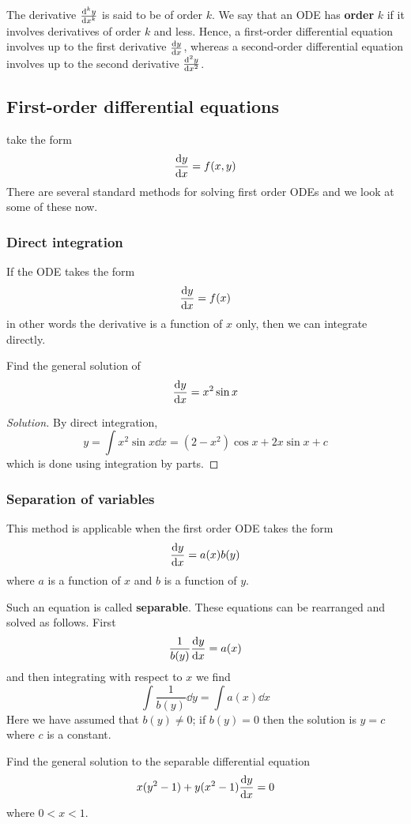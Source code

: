 The derivative $\dv[k]{y}{x}$ is said to be of order $k$. We say that an ODE has \textbf{order} $k$ if it involves derivatives of order $k$ and less. Hence, a first-order differential equation involves up to the first derivative $\dv{y}{x}$, whereas a second-order differential equation involves up to the second derivative $\dv[2]{y}{x}$.

\subsection{First-order differential equations}
 take the form
\[ \dv{y}{x} = f(x,y) \]
There are several standard methods for solving first order ODEs and we look at some of these now.

\subsubsection{Direct integration}
If the ODE takes the form
\[ \dv{y}{x} = f(x) \]
in other words the derivative is a function of $x$ only, then we can integrate directly.

\begin{exmp}{}{}
Find the general solution of
\[ \dv{y}{x} = x^2\sin x \]
\end{exmp}

\begin{proof}[Solution]
By direct integration,
\[ y = \int x^2\sin x \dd{x} = (2-x^2) \cos x + 2x \sin x + c \]
which is done using integration by parts.
\end{proof}

\subsubsection{Separation of variables}
This method is applicable when the first order ODE takes the form
\[ \dv{y}{x} = a(x)b(y) \]
where $a$ is a function of $x$ and $b$ is a function of $y$. 

Such an equation is called \textbf{separable}. These equations can be rearranged and solved as follows. First
\[ \frac{1}{b(y)}\dv{y}{x} = a(x) \]
and then integrating with respect to $x$ we find
\[ \int \frac{1}{b(y)} \dd{y} = \int a(x) \dd{x} \]
Here we have assumed that $b(y) \neq 0$; if $b(y) = 0$ then the solution is $y = c$ where $c$ is a constant.

\begin{exmp}{}{}
Find the general solution to the separable differential equation
\[ x(y^2-1) + y(x^2-1)\dv{y}{x} = 0 \]
where $0<x<1$.
\end{exmp}

